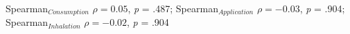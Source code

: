 Spearman$_{Consumption}$ $\rho = 0.05$, \textit{p} = .487; Spearman$_{Application}$ $\rho = -0.03$, \textit{p} = .904; Spearman$_{Inhalation}$ $\rho = -0.02$, \textit{p} = .904%
